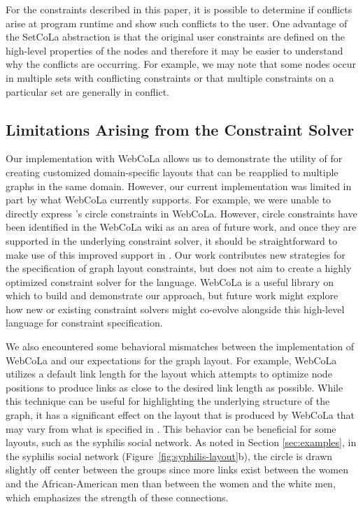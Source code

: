 For the constraints described in this paper, it is possible to determine if
conflicts arise at program runtime and show such conflicts to the user. One
advantage of the SetCoLa abstraction is that the original user constraints
are defined on the high-level properties of the nodes and therefore it may
be easier to understand why the conflicts are occurring. For example, we may
note that some nodes occur in multiple sets with conflicting constraints
or that multiple constraints on a particular set are generally in conflict.

\subsection{Limitations Arising from the Constraint Solver}



Our implementation with WebCoLa allows us to demonstrate the utility of
\projectname for creating customized domain-specific layouts that can be
reapplied to multiple graphs in the same domain. However, our current
implementation was limited in part by what WebCoLa currently supports. For
example, we were unable to directly express \projectname's circle constraints in
WebCoLa.  However, circle constraints have been identified in the WebCoLa
wiki as an area of future work, and once they are supported in the
underlying constraint solver, it should be straightforward to make use of
this improved support in \projectname.
Our work contributes new strategies for the
specification of graph layout constraints, but does not aim to create a
highly optimized constraint solver for the language. WebCoLa is a useful
library on which to build and demonstrate our approach, but 
future work might explore how new or existing constraint solvers might
co-evolve alongside this high-level language for constraint specification.

We also encountered some behavioral mismatches between the implementation
of WebCoLa and our expectations for the graph layout. For example, WebCoLa
utilizes a default link length for the layout which attempts to optimize
node positions to produce links as close to the desired link length as
possible. While this technique can be useful for highlighting the underlying 
structure of the graph, it has a significant effect on the layout that is
produced by WebCoLa that may vary from what is specified in \projectname.
This behavior can be beneficial for some layouts, such as the syphilis social network.
As noted in Section \ref{sec:examples}, in the syphilis social network
(Figure~\ref{fig:syphilis-layout}b), the circle is drawn slightly off
center between the groups since more links exist between the
women and the African-American men than between the women and
the white men, which emphasizes the strength of these
connections.

